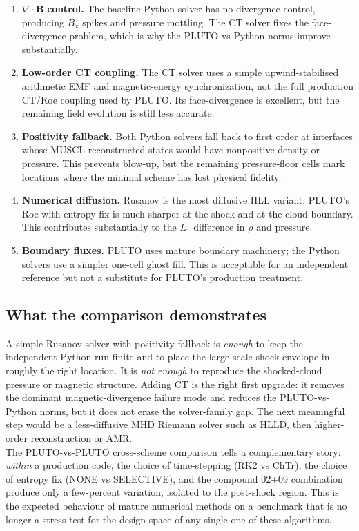 \documentclass[11pt,a4paper]{article}
\begin{document}
\begin{enumerate}
  \item $\nabla\!\cdot\!\mathbf{B}$ \textbf{control.} The baseline Python solver has no divergence control, producing $B_x$ spikes and pressure mottling. The CT solver fixes the face-divergence problem, which is why the PLUTO-vs-Python norms improve substantially.
  \item \textbf{Low-order CT coupling.} The CT solver uses a simple upwind-stabilised arithmetic EMF and magnetic-energy synchronization, not the full production CT/Roe coupling used by PLUTO. Its face-divergence is excellent, but the remaining field evolution is still less accurate.
  \item \textbf{Positivity fallback.} Both Python solvers fall back to first order at interfaces whose MUSCL-reconstructed states would have nonpositive density or pressure. This prevents blow-up, but the remaining pressure-floor cells mark locations where the minimal scheme has lost physical fidelity.
  \item \textbf{Numerical diffusion.} Rusanov is the most diffusive HLL variant; PLUTO's Roe with entropy fix is much sharper at the shock and at the cloud boundary. This contributes substantially to the $L_{1}$ difference in $\rho$ and pressure.
  \item \textbf{Boundary fluxes.} PLUTO uses mature boundary machinery; the Python solvers use a simpler one-cell ghost fill. This is acceptable for an independent reference but not a substitute for PLUTO's production treatment.
\end{enumerate}

\subsection{What the comparison demonstrates}

A simple Rusanov solver with positivity fallback is \emph{enough} to keep the independent Python run finite and to place the large-scale shock envelope in roughly the right location. It is \emph{not enough} to reproduce the shocked-cloud pressure or magnetic structure. Adding CT is the right first upgrade: it removes the dominant magnetic-divergence failure mode and reduces the PLUTO-vs-Python norms, but it does not erase the solver-family gap. The next meaningful step would be a less-diffusive MHD Riemann solver such as HLLD, then higher-order reconstruction or AMR.
\\

The PLUTO-vs-PLUTO cross-scheme comparison tells a complementary story: \emph{within} a production code, the choice of time-stepping (RK2 vs ChTr), the choice of entropy fix (NONE vs SELECTIVE), and the compound 02+09 combination produce only a few-percent variation, isolated to the post-shock region. This is the expected behaviour of mature numerical methods on a benchmark that is no longer a stress test for the design space of any single one of these algorithms.
\end{document}
